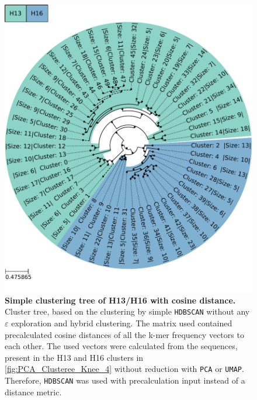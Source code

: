 \begin{figure}[!hbt]
    \centering
    \includegraphics[width=\textwidth]{PCA/Clustertree_Segment_4_H_Cosine.pdf}
    \caption[Simple clustering tree of H13/H16 with cosine distance]{\textbf{Simple clustering tree of H13/H16 with cosine distance.} Cluster tree, based on the clustering by simple \texttt{HDBSCAN} without any $\varepsilon$ exploration and hybrid clustering. The matrix used contained precalculated cosine distances of all the k-mer frequency vectors to each other. The used vectors were calculated from the sequences, present in the H13 and H16 clusters in \autoref{fig:PCA_Clusteree_Knee_4} without reduction with \texttt{PCA} or \texttt{UMAP}. Therefore, \texttt{HDBSCAN} was used with precalculation input instead of a distance metric.}
    \label{fig:Simple_Clustertree_Cosine}
\end{figure}

